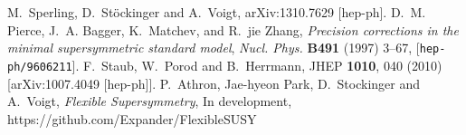 \documentclass[final,3p,times]{elsarticle}
\begin{document}
\begin{thebibliography}{10}
  M.~Sperling, D.~St\"ockinger and A.~Voigt,
  arXiv:1310.7629 [hep-ph].
D.~M. Pierce, J.~A. Bagger, K.~Matchev, and R.~jie Zhang, {\it Precision
  corrections in the minimal supersymmetric standard model},  {\em Nucl. Phys.}
  {\bf B491} (1997) 3--67, 
[{\tt hep-ph/9606211}].
  F.~Staub, W.~Porod and B.~Herrmann,
  JHEP {\bf 1010}, 040 (2010)
  [arXiv:1007.4049 [hep-ph]].
P.~Athron, Jae-hyeon Park, D.~Stockinger and A.~Voigt, {\it Flexible Supersymmetry}, In development, \\
https://github.com/Expander/FlexibleSUSY


















%
\end{thebibliography}
\end{document}
